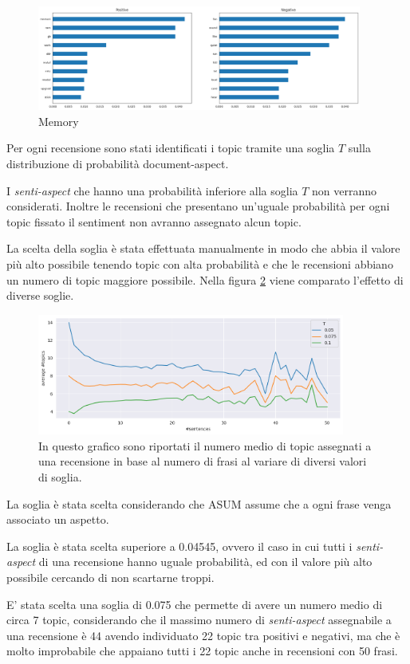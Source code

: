 \begin{figure}[ht]
  \centering
  \includegraphics[width=0.95\textwidth]{images/experiments/T44-Memory.png}
  \caption{Memory}
  \label{fig:T44-Memory}
\end{figure}

\newpage

Per ogni recensione sono stati identificati i topic tramite una soglia $T$ sulla distribuzione di probabilità document-aspect.

I \textit{senti-aspect} che hanno una probabilità inferiore alla soglia $T$ non verranno considerati.
Inoltre le recensioni che presentano un'uguale probabilità per ogni topic fissato il sentiment non avranno assegnato alcun topic.

La scelta della soglia è stata effettuata manualmente in modo che abbia il valore più alto possibile tenendo topic con alta probabilità e che le recensioni abbiano un numero di topic maggiore possibile. Nella figura \ref{fig:T_soglia} viene comparato l'effetto di diverse soglie. 

\begin{figure}[ht]
  \centering
  \includegraphics[width=0.9\textwidth]{images/experiments/threshold_selection.png}
  \caption{In questo grafico sono riportati il numero medio di topic assegnati a una recensione in base al numero di frasi al variare di diversi valori di soglia.}
  \label{fig:T_soglia}
\end{figure}

La soglia è stata scelta considerando che ASUM assume che a ogni frase venga associato un aspetto.

La soglia è stata scelta superiore a 0.04545, ovvero il caso in cui tutti i \textit{senti-aspect} di una recensione hanno uguale probabilità, ed con il valore più alto possibile cercando di non scartarne troppi.

E' stata scelta una soglia di 0.075 che permette di avere un numero medio di circa 7 topic, considerando che il massimo numero di \textit{senti-aspect} assegnabile a una recensione è 44 avendo individuato 22 topic tra positivi e negativi, ma che è molto improbabile che appaiano tutti i 22 topic anche in recensioni con 50 frasi.
